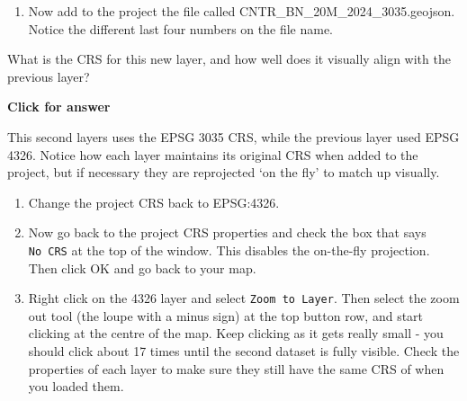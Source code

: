 \documentclass[
  letterpaper,
  DIV=11,
  numbers=noendperiod]{scrreprt}
\providecommand{\tightlist}{%
  \setlength{\itemsep}{0pt}\setlength{\parskip}{0pt}}\usepackage{longtable,booktabs,array}
\begin{document}
\begin{enumerate}
\def\labelenumi{(\arabic{enumi})}
\setcounter{enumi}{54}
\tightlist
\item
  Now add to the project the file called
  CNTR\_BN\_20M\_2024\_3035.geojson. Notice the different last four
  numbers on the file name.
\end{enumerate}

\begin{tcolorbox}[enhanced jigsaw, coltitle=black, toprule=.15mm, breakable, opacitybacktitle=0.6, left=2mm, colback=white, leftrule=.75mm, rightrule=.15mm, colbacktitle=quarto-callout-important-color!10!white, toptitle=1mm, titlerule=0mm, colframe=quarto-callout-important-color-frame, arc=.35mm, bottomtitle=1mm, opacityback=0, bottomrule=.15mm, title=\textcolor{quarto-callout-important-color}{\faExclamation}\hspace{0.5em}{Stop and Think}]

What is the CRS for this new layer, and how well does it visually align
with the previous layer?

\end{tcolorbox}

\begin{tcolorbox}[enhanced jigsaw, toprule=.15mm, breakable, left=2mm, colframe=quarto-callout-important-color-frame, colback=white, arc=.35mm, leftrule=.75mm, opacityback=0, rightrule=.15mm, bottomrule=.15mm]

\vspace{-3mm}\textbf{Click for answer}\vspace{3mm}

This second layers uses the EPSG 3035 CRS, while the previous layer used
EPSG 4326. Notice how each layer maintains its original CRS when added
to the project, but if necessary they are reprojected `on the fly' to
match up visually.

\end{tcolorbox}

\begin{enumerate}
\def\labelenumi{(\arabic{enumi})}
\setcounter{enumi}{55}
\item
  Change the project CRS back to EPSG:4326.
\item
  Now go back to the project CRS properties and check the box that says
  \texttt{No\ CRS} at the top of the window. This disables the
  on-the-fly projection. Then click OK and go back to your map.
\item
  Right click on the 4326 layer and select \texttt{Zoom\ to\ Layer}.
  Then select the zoom out tool (the loupe with a minus sign) at the top
  button row, and start clicking at the centre of the map. Keep clicking
  as it gets really small - you should click about 17 times until the
  second dataset is fully visible. Check the properties of each layer to
  make sure they still have the same CRS of when you loaded them.
\end{enumerate}
\end{document}
